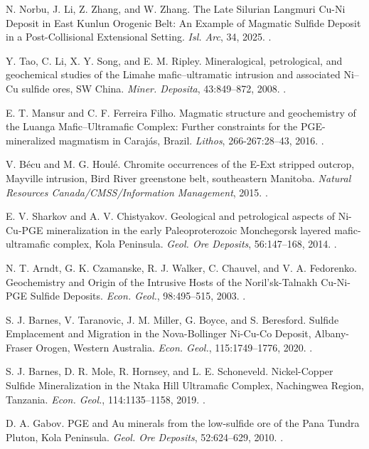  N. Norbu, J. Li, Z. Zhang, and W. Zhang. The Late Silurian Langmuri Cu-Ni Deposit in East Kunlun Orogenic Belt: An Example of Magmatic Sulfide Deposit in a Post-Collisional Extensional Setting. \textit{Isl. Arc}, 34, 2025. .

 Y. Tao, C. Li, X. Y. Song, and E. M. Ripley. Mineralogical, petrological, and geochemical studies of the Limahe mafic--ultramatic intrusion and associated Ni--Cu sulfide ores, SW China. \textit{Miner. Deposita}, 43:849--872, 2008. .

 E. T. Mansur and C. F. Ferreira Filho. Magmatic structure and geochemistry of the Luanga Mafic--Ultramafic Complex: Further constraints for the PGE-mineralized magmatism in Carajás, Brazil. \textit{Lithos}, 266-267:28--43, 2016. .

 V. Bécu and M. G. Houlé. Chromite occurrences of the E-Ext stripped outcrop, Mayville intrusion, Bird River greenstone belt, southeastern Manitoba. \textit{Natural Resources Canada/CMSS/Information Management}, 2015. .

 E. V. Sharkov and A. V. Chistyakov. Geological and petrological aspects of Ni-Cu-PGE mineralization in the early Paleoproterozoic Monchegorsk layered mafic-ultramafic complex, Kola Peninsula. \textit{Geol. Ore Deposits}, 56:147--168, 2014. .

 N. T. Arndt, G. K. Czamanske, R. J. Walker, C. Chauvel, and V. A. Fedorenko. Geochemistry and Origin of the Intrusive Hosts of the Noril'sk-Talnakh Cu-Ni-PGE Sulfide Deposits. \textit{Econ. Geol.}, 98:495--515, 2003. .

 S. J. Barnes, V. Taranovic, J. M. Miller, G. Boyce, and S. Beresford. Sulfide Emplacement and Migration in the Nova-Bollinger Ni-Cu-Co Deposit, Albany-Fraser Orogen, Western Australia. \textit{Econ. Geol.}, 115:1749--1776, 2020. .

 S. J. Barnes, D. R. Mole, R. Hornsey, and L. E. Schoneveld. Nickel-Copper Sulfide Mineralization in the Ntaka Hill Ultramafic Complex, Nachingwea Region, Tanzania. \textit{Econ. Geol.}, 114:1135--1158, 2019. .

 D. A. Gabov. PGE and Au minerals from the low-sulfide ore of the Pana Tundra Pluton, Kola Peninsula. \textit{Geol. Ore Deposits}, 52:624--629, 2010. .

